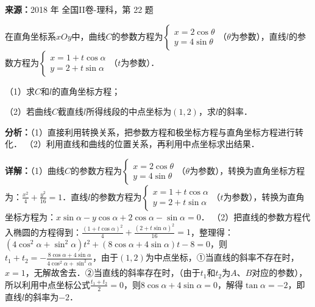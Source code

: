 \begin{question}[points=10]
\textbf{来源：}2018 年 全国II卷-理科，第 22 题\par
[选修4-4：坐标系与参数方程]

在直角坐标系$xOy$中，曲线$C$的参数方程为$\begin{cases} x=2\cos\theta \\ y=4\sin\theta \end{cases}$（$\theta$为参数），直线$l$的参数方程为$\begin{cases} x=1+t\cos\alpha \\ y=2+t\sin\alpha \end{cases}$（$t$为参数）．

（1）求$C$和$l$的直角坐标方程；

（2）若曲线$C$截直线$l$所得线段的中点坐标为$(1,2)$，求$l$的斜率．
\begin{solution}

\textbf{分析：}（1）直接利用转换关系，把参数方程和极坐标方程与直角坐标方程进行转化．
（2）利用直线和曲线的位置关系，再利用中点坐标求出结果．

\textbf{详解：}（1）曲线$C$的参数方程为$\begin{cases} x=2\cos\theta \\ y=4\sin\theta \end{cases}$（$\theta$为参数），转换为直角坐标方程为：$\frac{x^2}{4}+\frac{y^2}{16}=1$．直线$l$的参数方程为$\begin{cases} x=1+t\cos\alpha \\ y=2+t\sin\alpha \end{cases}$（$t$为参数），转换为直角坐标方程为：$x\sin\alpha-y\cos\alpha+2\cos\alpha-\sin\alpha=0$．
（2）把直线的参数方程代入椭圆的方程得到：$\frac{(1+t\cos\alpha)^2}{4}+\frac{(2+t\sin\alpha)^2}{16}=1$，整理得：$(4\cos^2\alpha+\sin^2\alpha)t^2+(8\cos\alpha+4\sin\alpha)t-8=0$，则$t_1+t_2=-\frac{8\cos\alpha+4\sin\alpha}{4\cos^2\alpha+\sin^2\alpha}$，由于$(1,2)$为中点坐标，①当直线的斜率不存在时，$x=1$，无解故舍去．②当直线的斜率存在时，（由于$t_1$和$t_2$为$A$、$B$对应的参数），所以利用中点坐标公式$\frac{t_1+t_2}{2}=0$，则$8\cos\alpha+4\sin\alpha=0$，解得$\tan\alpha=-2$，即直线$l$的斜率为$-2$．
\end{solution}
\end{question}

